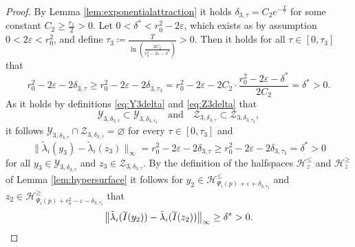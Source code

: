 \documentclass[10pt]{article}
\numberwithin{equation}{section}
\newcommand{\eps}{\varepsilon}
\newcommand\norm[1]{\left\lVert#1\right\rVert}
\newcommand\normm[1]{\big\lVert#1\big\lVert}
\begin{document}
	\begin{proof}
		By Lemma \ref{lem:exponentialattraction} it holds $\delta_{3,\tau} = C_2 e^{-\frac{T}{\tau}}$ for some constant $C_2\geq \frac{r_1}{2}>0$. Let $0<\delta^\ast<r_0^2-2\eps$, which exists as by assumption $0<2\eps<r_0^2$, and define $\tau_3 \coloneqq \frac{T}{\ln\left(\frac{2C_2}{r_0^2-2\eps-\delta^\ast}\right)}>0$. Then it holds for all $\tau \in [0,\tau_3]$ that
		\begin{equation*}
			r_0^2-2\eps- 2\delta_{3,\tau} \geq	r_0^2-2\eps- 2\delta_{3,\tau_3} = r_0^2-2\eps-2C_2\cdot \frac{r_0^2-2\eps-\delta^\ast}{2C_2} = \delta^\ast> 0. 
		\end{equation*}
		As it holds by definitions \eqref{eq:Y3delta} and \eqref{eq:Z3delta} that
		\begin{equation*}
			\mathcal{Y}_{3,\delta_{3,\tau}}\subset \mathcal{Y}_{3,\delta_{3,\tau_3}} \quad \text{and} \quad \mathcal{Z}_{3,\delta_{3,\tau}}\subset\mathcal{Z}_{3,\delta_{3,\tau_3}},
		\end{equation*}
		it follows $\mathcal{Y}_{3,\delta_{3,\tau}} \cap \mathcal{Z}_{3,\delta_{3,\tau}} =  \varnothing$ for every $\tau\in [0,\tau_3]$ and
		\begin{equation*}
			\normm{\tilde{\lambda}_i(y_3)-\tilde{\lambda}_i(z_3)}_\infty = r_0^2-2\eps- 2\delta_{3,\tau}  \geq r_0^2-2\eps- 2\delta_{3,\tau_3} = \delta^\ast > 0
		\end{equation*}
		for all $y_3 \in \mathcal{Y}_{3,\delta_{3,\tau}}$ and $z_3 \in \mathcal{Z}_{3,\delta_{3,\tau}}$.	By the definition of the halfspaces $\mathcal{H}_z^{\leq}$ and $\mathcal{H}_z^{\geq}$ of Lemma \ref{lem:hypersurface} it follows for $y_2\in\mathcal{H}^{\leq}_{\Psi_i(p)+\eps+\delta_{3,\tau_3}}$ and $z_2\in\mathcal{H}^{\geq}_{\Psi_i(p)+r_0^2-\eps-\delta_{3,\tau_3}}$ that
		\begin{equation*}
			\normm{\tilde{\lambda}_i(\overline{I}(y_2))-\tilde{\lambda}_i(\overline{I}(z_2))}_\infty \geq \delta^\ast > 0. \qedhere
		\end{equation*}

\end{proof}
\end{document}
